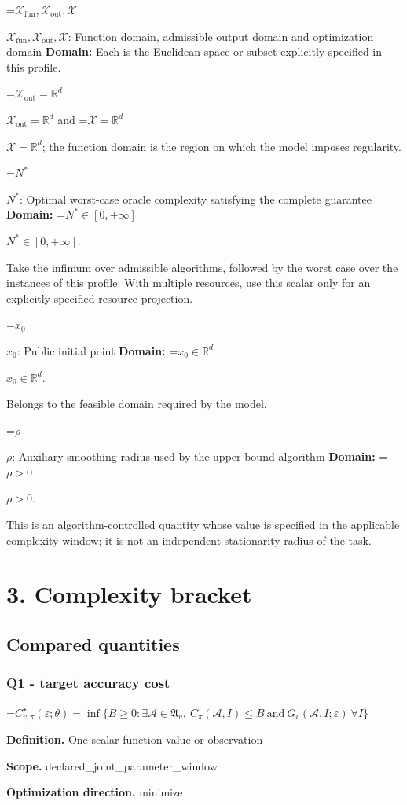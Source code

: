 \documentclass[10pt,a4paper]{article}
\newcommand{\AtlasMath}[1]{\par\begingroup\centering\setbox0=\hbox{$\displaystyle #1$}\ifdim\wd0>1.4\linewidth\typeout{ATLAS WIDE FORMULA: \the\wd0}\fi\ifdim\wd0>\linewidth\resizebox{\linewidth}{!}{\box0}\else\box0\fi\par\endgroup}
\newcommand{\AtlasInlineMath}[1]{\begingroup\setbox0=\hbox{$#1$}\ifdim\wd0>.4\linewidth\endgroup\AtlasMath{#1}\else\endgroup$#1$\fi}
\begin{document}
\AtlasInlineMath{\mathcal{X}_{\mathrm{fun}},\mathcal{X}_{\mathrm{out}},\mathcal{X}}: Function domain, admissible output domain and optimization domain \textbf{Domain:} Each is the Euclidean space or subset explicitly specified in this profile.

\AtlasInlineMath{\mathcal{X}_{\mathrm{out}}=\mathbb{R}^d} and \AtlasInlineMath{\mathcal{X}=\mathbb{R}^d}; the function domain is the region on which the model imposes regularity.

\AtlasInlineMath{N^*}: Optimal worst-case oracle complexity satisfying the complete guarantee \textbf{Domain:} \AtlasInlineMath{N^*\in[0,+\infty]}.

Take the infimum over admissible algorithms, followed by the worst case over the instances of this profile. With multiple resources, use this scalar only for an explicitly specified resource projection.

\AtlasInlineMath{x_0}: Public initial point \textbf{Domain:} \AtlasInlineMath{x_0\in\mathbb{R}^d}.

Belongs to the feasible domain required by the model.

\AtlasInlineMath{\rho}: Auxiliary smoothing radius used by the upper-bound algorithm \textbf{Domain:} \AtlasInlineMath{\rho>0}.

This is an algorithm-controlled quantity whose value is specified in the applicable complexity window; it is not an independent stationarity radius of the task.

\section{3. Complexity bracket}
\subsection{Compared quantities}
\subsubsection{Q1 - target accuracy cost}
\AtlasMath{C^\star_{v,\pi}(\varepsilon;\theta)=\inf\{B\ge0:\exists\mathcal A\in\mathfrak A_v,\ C_\pi(\mathcal A,I)\le B\ \text{and}\ G_v(\mathcal A,I;\varepsilon)\ \forall I\}}
\textbf{Definition.} One scalar function value or observation

\textbf{Scope.} declared\_joint\_parameter\_window

\textbf{Optimization direction.} minimize
\end{document}
